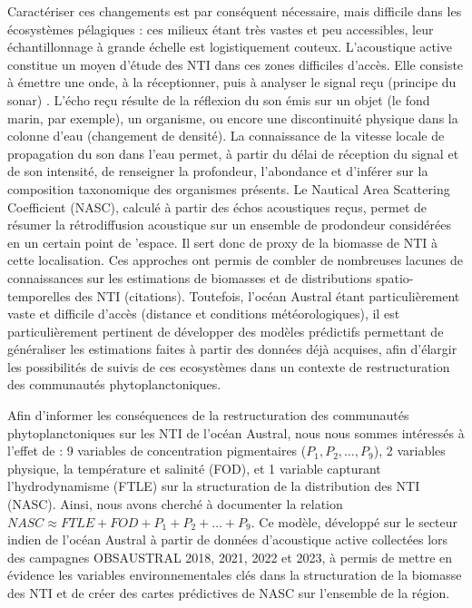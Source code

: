 \documentclass[11pt,a4paper,oneside]{report}
\begin{document}
	Caractériser ces changements est par conséquent nécessaire, mais difficile dans les écosystèmes pélagiques : ces milieux étant très vastes et peu accessibles, leur échantillonnage à grande échelle est logistiquement couteux. L'acoustique active constitue un moyen d'étude des NTI dans ces zones difficiles d'accès. Elle consiste à émettre une onde, à la réceptionner, puis à analyser le signal reçu (principe du sonar) \cite{benoitbird2016ecological}. L'écho reçu résulte de la réflexion du son émis sur un objet (le fond marin, par exemple), un organisme, ou encore une discontinuité physique dans la colonne d'eau (changement de densité). La connaissance de la vitesse locale de propagation du son dans l'eau permet, à partir du délai de réception du signal et de son intensité, de renseigner la profondeur, l'abondance et d'inférer sur la composition taxonomique des organismes présents. Le Nautical Area Scattering Coefficient (NASC), calculé à partir des échos acoustiques reçus, permet de résumer la rétrodiffusion acoustique sur un ensemble de prodondeur considérées en un certain point de 'espace. Il sert donc de proxy de la biomasse de NTI à cette localisation. Ces approches ont permis de combler de nombreuses lacunes de connaissances sur les estimations de biomasses et de distributions spatio-temporelles des NTI (citations). Toutefois, l'océan Austral étant particulièrement vaste et difficile d'accès (distance et conditions météorologiques), il est particulièrement pertinent de développer des modèles prédictifs permettant de généraliser les estimations faites à partir des données déjà acquises, afin d'élargir les possibilités de suivis de ces ecosystèmes dans un contexte de restructuration des communautés phytoplanctoniques.
	
	\vspace{0.3cm}
	
	Afin d'informer les conséquences de la restructuration des communautés phytoplanctoniques sur les NTI de l'océan Austral, nous nous sommes intéressés à l'effet de : 9 variables de concentration pigmentaires ($P_1, P_2, \ldots, P_9$), 2 variables physique, la température et salinité (FOD), et 1 variable capturant l'hydrodynamisme (FTLE) sur la structuration de la distribution des NTI (NASC). Ainsi, nous avons cherché à documenter la relation $NASC \approx FTLE + FOD + P_1 + P_2 + \ldots + P_9$. Ce modèle, développé sur le secteur indien de l'océan Austral à partir de données d'acoustique active collectées lors des campagnes OBSAUSTRAL 2018, 2021, 2022 et 2023, à permis de mettre en évidence les variables environnementales clés dans la structuration de la biomasse des NTI et de créer des cartes prédictives de NASC sur l'ensemble de la région. 
	
\end{document}
